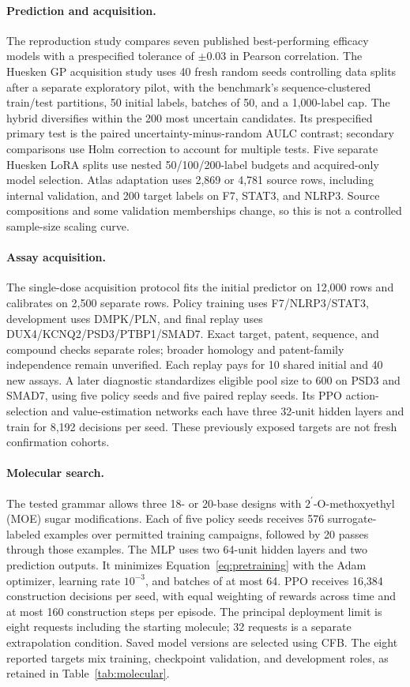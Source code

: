 \documentclass[letterpaper]{article}
\begin{document}
\paragraph{Prediction and acquisition.}
The reproduction study compares seven published best-performing efficacy models with a prespecified tolerance of $\pm0.03$ in Pearson correlation. The Huesken GP acquisition study uses 40 fresh random seeds controlling data splits after a separate exploratory pilot, with the benchmark's sequence-clustered train/test partitions, 50 initial labels, batches of 50, and a 1,000-label cap. The hybrid diversifies within the 200 most uncertain candidates. Its prespecified primary test is the paired uncertainty-minus-random AULC contrast; secondary comparisons use Holm correction to account for multiple tests. Five separate Huesken LoRA splits use nested 50/100/200-label budgets and acquired-only model selection. Atlas adaptation uses 2,869 or 4,781 source rows, including internal validation, and 200 target labels on F7, STAT3, and NLRP3. Source compositions and some validation memberships change, so this is not a controlled sample-size scaling curve.

\paragraph{Assay acquisition.}
The single-dose acquisition protocol fits the initial predictor on 12,000 rows and calibrates on 2,500 separate rows. Policy training uses F7/NLRP3/STAT3, development uses DMPK/PLN, and final replay uses DUX4/KCNQ2/PSD3/PTBP1/SMAD7. Exact target, patent, sequence, and compound checks separate roles; broader homology and patent-family independence remain unverified. Each replay pays for 10 shared initial and 40 new assays. A later diagnostic standardizes eligible pool size to 600 on PSD3 and SMAD7, using five policy seeds and five paired replay seeds. Its PPO action-selection and value-estimation networks each have three 32-unit hidden layers and train for 8,192 decisions per seed. These previously exposed targets are not fresh confirmation cohorts.

\paragraph{Molecular search.}
The tested grammar allows three 18- or 20-base designs with $2^{\prime}$-O-methoxyethyl (MOE) sugar modifications. Each of five policy seeds receives 576 surrogate-labeled examples over permitted training campaigns, followed by 20 passes through those examples. The MLP uses two 64-unit hidden layers and two prediction outputs. It minimizes Equation~\ref{eq:pretraining} with the Adam optimizer, learning rate $10^{-3}$, and batches of at most 64. PPO receives 16,384 construction decisions per seed, with equal weighting of rewards across time and at most 160 construction steps per episode. The principal deployment limit is eight requests including the starting molecule; 32 requests is a separate extrapolation condition. Saved model versions are selected using CFB. The eight reported targets mix training, checkpoint validation, and development roles, as retained in Table~\ref{tab:molecular}.
\end{document}
